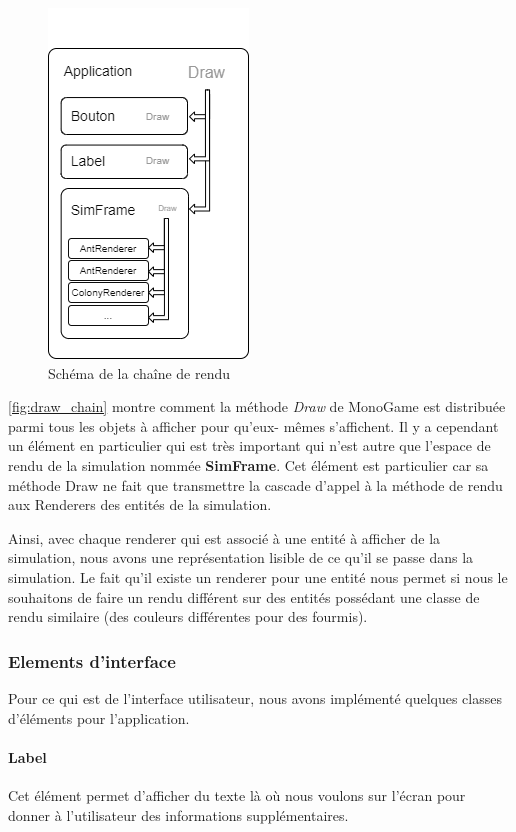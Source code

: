 \documentclass{EPUProjetDi}
\begin{document}
\begin{figure}[h]
    \centering
    \includegraphics[scale=0.8]{application_draw.png}
    \caption{Schéma de la chaîne de rendu}
    \label{fig:draw_chain}
\end{figure}

\autoref{fig:draw_chain} montre comment la méthode \textit{Draw} de MonoGame est distribuée parmi tous les objets à afficher pour qu'eux-
mêmes s'affichent.
Il y a cependant un élément en particulier qui est très important qui n'est autre que l'espace de rendu de la simulation nommée \textbf{SimFrame}.
Cet élément est particulier car sa méthode Draw ne fait que transmettre la cascade d'appel à la méthode de rendu aux Renderers des entités
de la simulation.

Ainsi, avec chaque renderer qui est associé à une entité à afficher de la simulation, nous avons une représentation lisible de ce qu'il
se passe dans la simulation. Le fait qu'il existe un renderer pour une entité nous permet si nous le souhaitons de faire un rendu différent
sur des entités possédant une classe de rendu similaire (des couleurs différentes pour des fourmis).

\subsubsection{Elements d'interface}

Pour ce qui est de l'interface utilisateur, nous avons implémenté quelques classes d'éléments pour l'application.

\paragraph{Label}
Cet élément permet d'afficher du texte là où nous voulons sur l'écran pour donner à l'utilisateur des informations supplémentaires.
\end{document}
